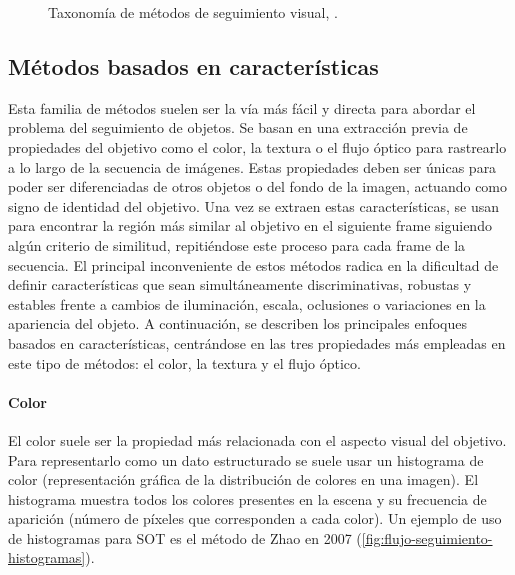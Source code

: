 \begin{figure}[htbp]
{%
    }
    \caption[Taxonomía de métodos de seguimiento visual]{Taxonomía de métodos de seguimiento visual, \cite{Articulo_Concepto_SOT}.}
    \label{fig:taxonomia-seguimiento-visual}
\end{figure}

    \subsection{Métodos basados en características}
    Esta familia de métodos suelen ser la vía más fácil y directa para abordar el problema del seguimiento de objetos. Se basan en una extracción previa de propiedades del objetivo como el color, la textura o el flujo óptico para rastrearlo a lo largo de la secuencia de imágenes. Estas propiedades deben ser únicas para poder ser diferenciadas de otros objetos o del fondo de la imagen, actuando como signo de identidad del objetivo. Una vez se extraen estas características, se usan para encontrar la región más similar al objetivo en el siguiente frame siguiendo algún criterio de similitud, repitiéndose este proceso para cada frame de la secuencia. El principal inconveniente de estos métodos radica en la dificultad de definir características que sean simultáneamente discriminativas, robustas y estables frente a cambios de iluminación, escala, oclusiones o variaciones en la apariencia del objeto. A continuación, se describen los principales enfoques basados en características, centrándose en las tres propiedades más empleadas en este tipo de métodos: el color, la textura y el flujo óptico.

    \paragraph*{Color}
    El color suele ser la propiedad más relacionada con el aspecto visual del objetivo. Para representarlo como un dato estructurado se suele usar un histograma de color (representación gráfica de la distribución de colores en una imagen). El histograma muestra todos los colores presentes en la escena y su frecuencia de aparición (número de píxeles que corresponden a cada color). Un ejemplo de uso de histogramas para SOT es el método de Zhao en 2007 (\ref{fig:flujo-seguimiento-histogramas}). 

